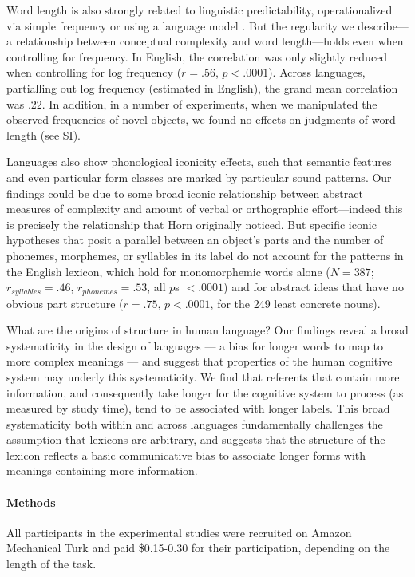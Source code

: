 \documentclass[12pt]{article}
\begin{document}
Word length is also strongly related to linguistic predictability, operationalized via simple frequency \cite{zipf1936} or using a language model \cite{piantadosi2011a}. But the regularity we describe---a relationship between conceptual complexity and word length---holds even when controlling for frequency. In English, the correlation was only slightly reduced when controlling for log frequency ($r = .56$, $p < .0001$). Across languages, partialling out log frequency (estimated in English), the grand mean correlation was .22. In addition, in a number of experiments, when we manipulated the observed frequencies of novel objects, we found no effects on judgments of word length (see SI). 

Languages also show phonological iconicity effects, such that semantic features \cite{maurer2006shape} and even particular form classes \cite{farmer2006phonological} are marked by particular sound patterns. Our findings could be due to some broad iconic relationship between abstract measures of complexity and amount of verbal or orthographic effort---indeed this is precisely the relationship that Horn originally noticed. But specific iconic hypotheses that posit a parallel between an object's parts and the number of phonemes, morphemes, or syllables in its label do not account for the patterns in the English lexicon, which hold for monomorphemic words alone ($N = 387$; $r_{syllables} = .46$, $r_{phonemes} = .53$, all $p$s $< .0001$) and for abstract ideas that have no obvious part structure ($r = .75$, $p< .0001$, for the 249 least concrete nouns). 

What are the origins of structure in human language? Our findings reveal a broad systematicity in the design of  languages  --- a bias for longer words to map to more complex meanings --- and suggest that properties of the human cognitive system may underly this systematicity. We find that referents that contain more information, and consequently take longer for the cognitive system to process (as measured by study time), tend to be associated with longer labels. This broad systematicity both within and across languages fundamentally challenges the assumption that lexicons are arbitrary, and suggests that the structure of the lexicon reflects a basic communicative bias to associate longer forms with meanings containing more information.


\paragraph*{Methods}
All participants in the experimental studies were recruited on Amazon Mechanical Turk and paid \$0.15-0.30 for their participation, depending on the length of the task. 
\end{document}
